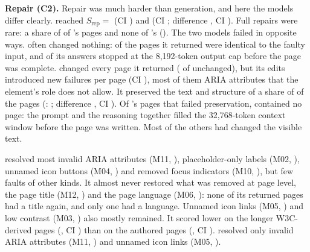 \textbf{Repair (C2).} Repair was much harder than generation, and here the models differ clearly.
\Q{} reached $S_\text{rep}={}$ (CI ) and
\QV{}  (CI ; difference
, CI ).
Full repairs were rare: a share of  of \Q's pages and none of
\QV's ().
The two models failed in opposite ways. \QV{} often changed nothing:
 of the 
pages it returned were identical to the faulty input, and 
of its  answers stopped at the 8{,}192-token output cap before
the page was complete. \Q{} changed every page it returned
( of  unchanged),
but its edits introduced  new failures per page (CI
), most of them ARIA attributes that the element's role does not
allow. It preserved the text and structure of a share of  of the pages
(\QV: ; difference ,
CI ). Of \Q's pages that failed
preservation,  contained no page: the prompt and the reasoning
together filled the 32{,}768-token context window before the page was written. Most of the others
had changed the visible text.

\Q{} resolved most invalid ARIA attributes (M11,
), placeholder-only labels (M02, ),
unnamed icon buttons (M04, ) and removed focus indicators (M10,
), but few faults of other kinds. It almost never restored what was removed at page level, the
page title (M12, ) and the page language (M06,
): none of its returned pages had a title again, and only one had a
language. Unnamed icon links (M05, ) and low contrast (M03,
) also mostly remained. It scored lower on the longer W3C-derived
pages (, CI ) than on the authored
pages (, CI ). \QV{} resolved
only invalid ARIA attributes (M11, ) and unnamed icon links
(M05, ).

